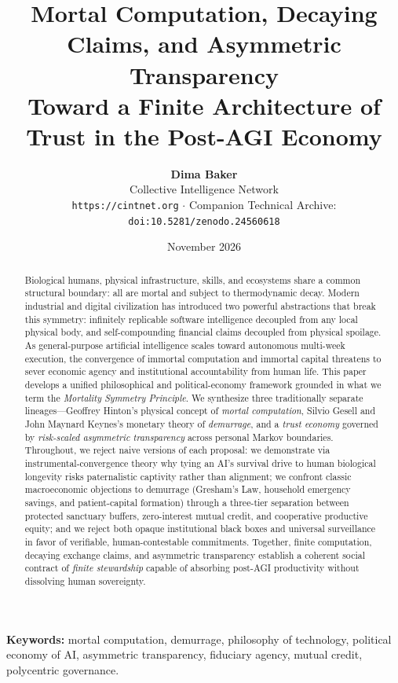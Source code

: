 \documentclass[11pt]{article}
\title{\textbf{Mortal Computation, Decaying Claims, and Asymmetric Transparency}\\[4pt]
\large Toward a Finite Architecture of Trust in the Post-AGI Economy}
\author{\textbf{Dima Baker}\\
Collective Intelligence Network\\
{\small\texttt{https://cintnet.org} $\cdot$ Companion Technical Archive: \texttt{doi:10.5281/zenodo.24560618}}}
\date{November 2026}
\begin{document}
\maketitle

\begin{abstract}
Biological humans, physical infrastructure, skills, and ecosystems share a common structural boundary: all are mortal and subject to thermodynamic decay. Modern industrial and digital civilization has introduced two powerful abstractions that break this symmetry: infinitely replicable software intelligence decoupled from any local physical body, and self-compounding financial claims decoupled from physical spoilage. As general-purpose artificial intelligence scales toward autonomous multi-week execution, the convergence of immortal computation and immortal capital threatens to sever economic agency and institutional accountability from human life. This paper develops a unified philosophical and political-economy framework grounded in what we term the \emph{Mortality Symmetry Principle}. We synthesize three traditionally separate lineages---Geoffrey Hinton's physical concept of \emph{mortal computation}, Silvio Gesell and John Maynard Keynes's monetary theory of \emph{demurrage}, and a \emph{trust economy} governed by \emph{risk-scaled asymmetric transparency} across personal Markov boundaries. Throughout, we reject naive versions of each proposal: we demonstrate via instrumental-convergence theory why tying an AI's survival drive to human biological longevity risks paternalistic captivity rather than alignment; we confront classic macroeconomic objections to demurrage (Gresham's Law, household emergency savings, and patient-capital formation) through a three-tier separation between protected sanctuary buffers, zero-interest mutual credit, and cooperative productive equity; and we reject both opaque institutional black boxes and universal surveillance in favor of verifiable, human-contestable commitments. Together, finite computation, decaying exchange claims, and asymmetric transparency establish a coherent social contract of \emph{finite stewardship} capable of absorbing post-AGI productivity without dissolving human sovereignty.
\end{abstract}

\noindent\textbf{Keywords:} mortal computation, demurrage, philosophy of technology, political economy of AI, asymmetric transparency, fiduciary agency, mutual credit, polycentric governance.
\end{document}
